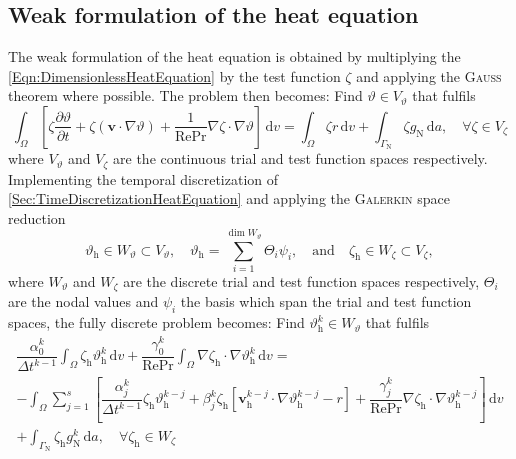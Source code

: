 \documentclass[]{scrartcl}
\newcommand{\pfrac}[2]{\frac{\partial #1}{\partial #2}}
\renewcommand{\d}{\,\mathrm{d}}
\newcommand{\bs}[1]{\boldsymbol{#1}}
\begin{document}
\subsection{Weak formulation of the heat equation}
The weak formulation of the heat equation is obtained by multiplying the \cref{Eqn:DimensionlessHeatEquation} by the test function $\zeta$ and applying the \textsc{Gauss} theorem where possible. The problem then becomes: Find $\vartheta \in V_\vartheta$ that fulfils
\begin{equation}
	\int_{\Omega}\left[ \zeta \pfrac{\vartheta}{t} + \zeta (\bs{v}\cdot \nabla \vartheta) + \dfrac{1}{\textrm{Re}\textrm{Pr}} \nabla \zeta  \cdot \nabla \vartheta \right] \d v = \int_{\Omega} \zeta r \d v + \int_{\Gamma_\textrm{N}} \zeta g_\textrm{N} \d a, \quad \forall \zeta \in V_\zeta
\end{equation}
where $V_\vartheta$ and $V_\zeta$ are the continuous trial and test function spaces respectively. Implementing the temporal discretization of \cref{Sec:TimeDiscretizationHeatEquation} and applying the \textsc{Galerkin} space reduction
\begin{equation*}
	\vartheta_\textrm{h} \in W_\vartheta \subset V_\vartheta, \quad \vartheta_\textrm{h} = \textstyle\sum_{i = 1}^{\dim W_\vartheta} \varTheta_i \psi_i,
	\quad \textrm{and} \quad
	\zeta_\textrm{h} \in W_\zeta \subset V_\zeta,
\end{equation*}
where $W_\vartheta$ and $W_\zeta$ are the discrete trial and test function spaces respectively, $\varTheta_i$ are the nodal values and $\psi_i$ the basis which span the trial and test function spaces, the fully discrete problem becomes: Find $\vartheta^k_\textrm{h} \in W_\vartheta$ that fulfils
\begin{equation*}
\begin{split}
\dfrac{\alpha_0^k}{\Delta t^{k-1}} 
\int_{\Omega}
\zeta_\textrm{h} \vartheta^k_\textrm{h}
\d v 
+ 
\dfrac{\gamma_0^k}{\textrm{Re}\textrm{Pr}}
\int_{\Omega} 
\nabla \zeta_\textrm{h} \cdot \nabla\vartheta^k_\textrm{h}
\d v
=
\\
-
\int_{\Omega}
\sum_{j=1}^{s} 
\left[
\dfrac{\alpha_j^k}{\Delta t^{k-1}}\zeta_\textrm{h} \vartheta^{k-j}_\textrm{h}
+
\beta_j^k \zeta_\textrm{h} \left[ \bs{v}^{k-j}_\textrm{h} \cdot \nabla \vartheta^{k-j}_\textrm{h} - r \right]
+
\dfrac{\gamma_j^k}{\textrm{Re}\textrm{Pr}} \nabla \zeta_\textrm{h} \cdot \nabla \vartheta^{k-j}_\textrm{h}
\right]
\d v \\
+ 
\int_{\Gamma_\textrm{N}}
 \zeta_\textrm{h} g_\textrm{N}^k
\d a, \quad \forall \zeta_\textrm{h} \in W_\zeta
\end{split} 	
\end{equation*}
\end{document}
